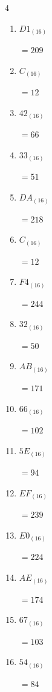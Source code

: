 \begin{multicols}{4}
\begin{enumerate}
        $=99$

  \item $D1_{(16)}$

        $=209$

  \item $C_{(16)}$

        $=12$

  \item $42_{(16)}$

        $=66$

  \item $33_{(16)}$

        $=51$

  \item $DA_{(16)}$

        $=218$

  \item $C_{(16)}$

        $=12$

  \item $F4_{(16)}$

        $=244$

  \item $32_{(16)}$

        $=50$

  \item $AB_{(16)}$

        $=171$

  \item $66_{(16)}$

        $=102$

  \item $5E_{(16)}$

        $=94$

  \item $EF_{(16)}$

        $=239$

\columnbreak %

  \item $E0_{(16)}$

        $=224$

  \item $AE_{(16)}$

        $=174$

  \item $67_{(16)}$

        $=103$

  \item $54_{(16)}$

        $=84$


\end{enumerate}
\end{multicols}
